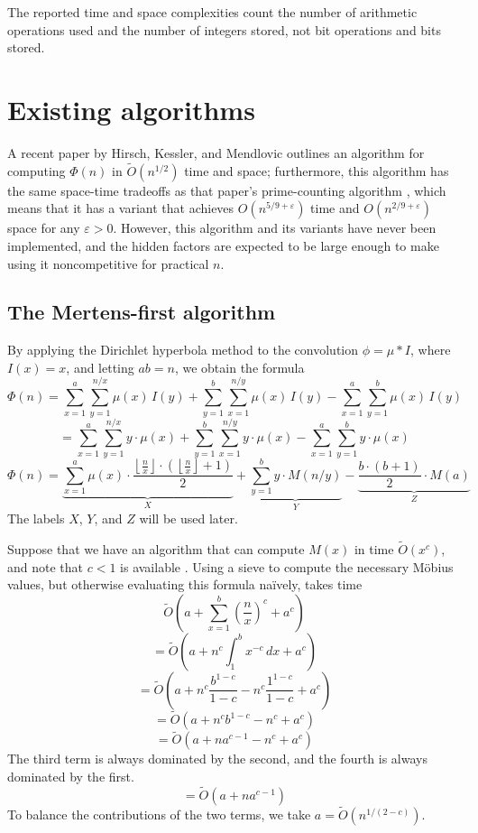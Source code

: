 \documentclass[12pt]{article}
\newcommand{\eqn}[1]{\begin{displaymath} #1 \end{displaymath}}
\newcommand{\neqn}[1]{\begin{equation} #1 \end{equation}}
\newcommand{\floor}[1]{{\left\lfloor #1 \right\rfloor}}
\newcommand{\integral}[4]{\displaystyle\int_{#3}^{#4} \! #1 \, d#2}
\newcommand{\floordiv}[2]{\floor{\frac{#1}{#2}}}
\newcommand{\softO}[0]{\widetilde{O}}
\begin{document}
The reported time and space complexities count the number of arithmetic operations used and the number of integers stored, not bit operations and bits stored.

\section{Existing algorithms}

A recent paper by Hirsch, Kessler, and Mendlovic \cite[\S 5.6]{HKM2024} outlines an algorithm for computing $\Phi(n)$ in $\softO(n^{1/2})$ time and space; furthermore, this algorithm has the same space-time tradeoffs as that paper's prime-counting algorithm \cite{HKM2025}, which means that it has a variant that achieves $O(n^{5/9+\varepsilon})$ time and $O(n^{2/9+\varepsilon})$ space for any $\varepsilon>0$.  However, this algorithm and its variants have never been implemented, and the hidden factors are expected to be large enough to make using it noncompetitive for practical $n$.

\subsection{The Mertens-first algorithm}

By applying the Dirichlet hyperbola method to the convolution $\phi = \mu * I$, where $I(x)=x$, and letting $ab=n$, we obtain the formula
\eqn{\Phi(n) = \sum_{x=1}^{a}\sum_{y=1}^{n/x} \mu(x) \, I(y) + \sum_{y=1}^{b}\sum_{x=1}^{n/y} \mu(x) \, I(y) - \sum_{x=1}^{a}\sum_{y=1}^{b} \mu(x) \, I(y)}
\eqn{ = \sum_{x=1}^{a}\sum_{y=1}^{n/x} y \cdot \mu(x) + \sum_{y=1}^{b}\sum_{x=1}^{n/y} y \cdot \mu(x) - \sum_{x=1}^{a}\sum_{y=1}^{b} y \cdot \mu(x)}
\neqn{\Phi(n) = \underbrace{\sum_{x=1}^{a} \mu(x) \cdot \frac{\floordiv{n}{x} \cdot \left(\floordiv{n}{x} + 1\right)}{2}}_{X} + \underbrace{\sum_{y=1}^{b} y \cdot M(n/y)}_{Y} - \underbrace{\frac{b \cdot (b+1)}{2} \cdot M(a)}_{Z} \label{PhiFormula}}
The labels $X$, $Y$, and $Z$ will be used later.

Suppose that we have an algorithm that can compute $M(x)$ in time $\softO(x^c)$, and note that $c < 1$ is available \cite{DR1996}.  Using a sieve to compute the necessary M\"obius values, but otherwise evaluating this formula na\"{i}vely, takes time
\eqn{\softO\left( a + \sum_{x=1}^b \left(\frac{n}{x}\right)^c + a^c \right)}
\eqn{=\softO\left( a + n^c \integral{x^{-c}}{x}{1}{b} + a^c \right)}
\eqn{=\softO\left( a + n^c\frac{b^{1-c}}{1-c} - n^c\frac{1^{1-c}}{1-c} + a^c \right)}
\eqn{=\softO\left( a + n^c b^{1-c} - n^c + a^c \right)}
\eqn{=\softO\left( a + n a^{c-1} - n^c + a^c \right)}
The third term is always dominated by the second, and the fourth is always dominated by the first.
\eqn{=\softO\left( a + n a^{c-1} \right)}
To balance the contributions of the two terms, we take $a = \softO(n^{1/(2-c)})$.
\end{document}
